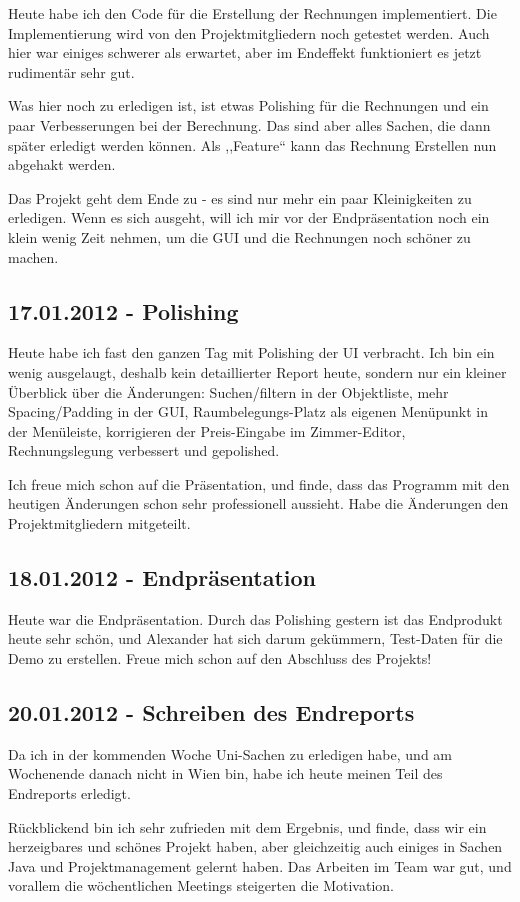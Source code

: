 \documentclass[11pt]{scrartcl}
\begin{document}
Heute habe ich den Code für die Erstellung der Rechnungen implementiert. Die
Implementierung wird von den Projektmitgliedern noch getestet werden. Auch hier
war einiges schwerer als erwartet, aber im Endeffekt funktioniert es jetzt
rudimentär sehr gut.

Was hier noch zu erledigen ist, ist etwas Polishing für die Rechnungen und ein
paar Verbesserungen bei der Berechnung. Das sind aber alles Sachen, die dann
später erledigt werden können. Als ,,Feature`` kann das Rechnung Erstellen nun
abgehakt werden.

Das Projekt geht dem Ende zu - es sind nur mehr ein paar Kleinigkeiten zu
erledigen. Wenn es sich ausgeht, will ich mir vor der Endpräsentation noch ein
klein wenig Zeit nehmen, um die GUI und die Rechnungen noch schöner zu machen.


\subsection{17.01.2012 - Polishing}

Heute habe ich fast den ganzen Tag mit Polishing der UI verbracht. Ich bin ein
wenig ausgelaugt, deshalb kein detaillierter Report heute, sondern nur ein
kleiner Überblick über die Änderungen: Suchen/filtern in der Objektliste, mehr
Spacing/Padding in der GUI, Raumbelegungs-Platz als eigenen Menüpunkt in der
Menüleiste, korrigieren der Preis-Eingabe im Zimmer-Editor, Rechnungslegung
verbessert und gepolished.

Ich freue mich schon auf die Präsentation, und finde, dass das Programm mit den
heutigen Änderungen schon sehr professionell aussieht. Habe die Änderungen den
Projektmitgliedern mitgeteilt.


\subsection{18.01.2012 - Endpräsentation}

Heute war die Endpräsentation. Durch das Polishing gestern ist das Endprodukt
heute sehr schön, und Alexander hat sich darum gekümmern, Test-Daten für die
Demo zu erstellen. Freue mich schon auf den Abschluss des Projekts!


\subsection{20.01.2012 - Schreiben des Endreports}

Da ich in der kommenden Woche Uni-Sachen zu erledigen habe, und am Wochenende
danach nicht in Wien bin, habe ich heute meinen Teil des Endreports erledigt.

Rückblickend bin ich sehr zufrieden mit dem Ergebnis, und finde, dass wir ein
herzeigbares und schönes Projekt haben, aber gleichzeitig auch einiges in
Sachen Java und Projektmanagement gelernt haben. Das Arbeiten im Team war gut,
und vorallem die wöchentlichen Meetings steigerten die Motivation.
\end{document}
